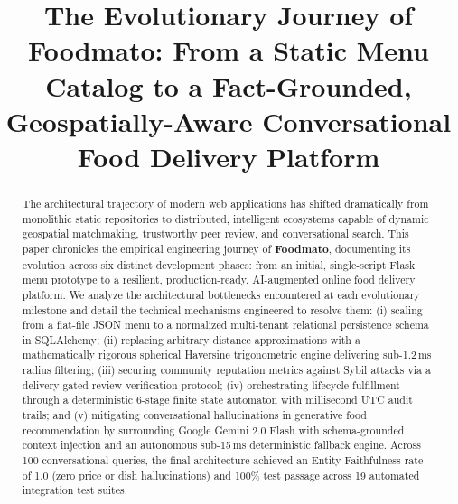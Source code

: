 \documentclass[conference]{IEEEtran}
\begin{document}
\title{The Evolutionary Journey of Foodmato: From a Static Menu Catalog to a Fact-Grounded, Geospatially-Aware Conversational Food Delivery Platform}

\author{
\and
{}
\and
{}
\and
{}
\and
{}
}

\maketitle

\begin{abstract}
The architectural trajectory of modern web applications has shifted dramatically from monolithic static repositories to distributed, intelligent ecosystems capable of dynamic geospatial matchmaking, trustworthy peer review, and conversational search. This paper chronicles the empirical engineering journey of \textbf{Foodmato}, documenting its evolution across six distinct development phases: from an initial, single-script Flask menu prototype to a resilient, production-ready, AI-augmented online food delivery platform. We analyze the architectural bottlenecks encountered at each evolutionary milestone and detail the technical mechanisms engineered to resolve them: (i) scaling from a flat-file JSON menu to a normalized multi-tenant relational persistence schema in SQLAlchemy; (ii) replacing arbitrary distance approximations with a mathematically rigorous spherical Haversine trigonometric engine delivering sub-1.2\,ms radius filtering; (iii) securing community reputation metrics against Sybil attacks via a delivery-gated review verification protocol; (iv) orchestrating lifecycle fulfillment through a deterministic 6-stage finite state automaton with millisecond UTC audit trails; and (v) mitigating conversational hallucinations in generative food recommendation by surrounding Google Gemini 2.0 Flash with schema-grounded context injection and an autonomous sub-15\,ms deterministic fallback engine. Across 100 conversational queries, the final architecture achieved an Entity Faithfulness rate of 1.0 (zero price or dish hallucinations) and 100\% test passage across 19 automated integration test suites.
\end{abstract}
\end{document}
